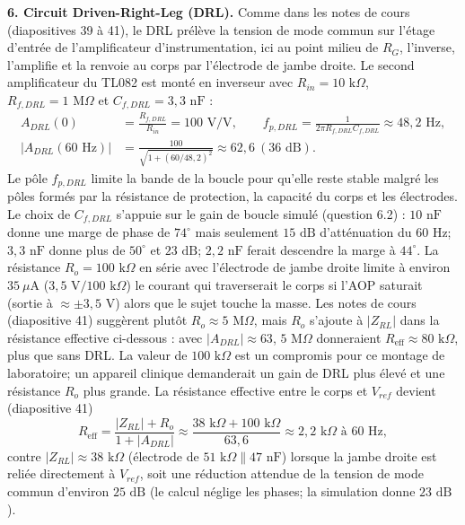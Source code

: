 \documentclass[11pt,letterpaper]{article}
\begin{document}
\textbf{6. Circuit Driven-Right-Leg (DRL).}
Comme dans les notes de cours (diapositives 39 à 41), le DRL prélève la tension de mode commun sur l'étage d'entrée de l'amplificateur d'instrumentation, ici au point milieu de $R_G$, l'inverse, l'amplifie et la renvoie au corps par l'électrode de jambe droite. Le second amplificateur du TL082 est monté en inverseur avec $R_{in} = 10\text{ k}\Omega$, $R_{f,DRL} = 1\text{ M}\Omega$ et $C_{f,DRL} = 3,3\text{ nF}$ :
\begin{align*}
A_{DRL}(0) &= \frac{R_{f,DRL}}{R_{in}} = 100\text{ V/V}, \qquad f_{p,DRL} = \frac{1}{2\pi R_{f,DRL} C_{f,DRL}} \approx 48,2\text{ Hz}, \\
|A_{DRL}(60\text{ Hz})| &= \frac{100}{\sqrt{1 + (60/48,2)^2}} \approx 62,6 \ (36\text{ dB}).
\end{align*}
Le pôle $f_{p,DRL}$ limite la bande de la boucle pour qu'elle reste stable malgré les pôles formés par la résistance de protection, la capacité du corps et les électrodes. Le choix de $C_{f,DRL}$ s'appuie sur le gain de boucle simulé (question 6.2) : $10\text{ nF}$ donne une marge de phase de $74^\circ$ mais seulement $15\text{ dB}$ d'atténuation du $60\text{ Hz}$; $3,3\text{ nF}$ donne plus de $50^\circ$ et $23\text{ dB}$; $2,2\text{ nF}$ ferait descendre la marge à $44^\circ$. La résistance $R_o = 100\text{ k}\Omega$ en série avec l'électrode de jambe droite limite à environ $35\ \mu\text{A}$ ($3,5\text{ V}/100\text{ k}\Omega$) le courant qui traverserait le corps si l'AOP saturait (sortie à $\approx \pm 3,5\text{ V}$) alors que le sujet touche la masse. Les notes de cours (diapositive 41) suggèrent plutôt $R_o \approx 5\text{ M}\Omega$, mais $R_o$ s'ajoute à $|Z_{RL}|$ dans la résistance effective ci-dessous : avec $|A_{DRL}| \approx 63$, $5\text{ M}\Omega$ donneraient $R_{\text{eff}} \approx 80\text{ k}\Omega$, plus que sans DRL. La valeur de $100\text{ k}\Omega$ est un compromis pour ce montage de laboratoire; un appareil clinique demanderait un gain de DRL plus élevé et une résistance $R_o$ plus grande. La résistance effective entre le corps et $V_{ref}$ devient (diapositive 41)
\[
R_{\text{eff}} = \frac{|Z_{RL}| + R_o}{1 + |A_{DRL}|} \approx \frac{38\text{ k}\Omega + 100\text{ k}\Omega}{63,6} \approx 2,2\text{ k}\Omega \text{ à } 60\text{ Hz},
\]
contre $|Z_{RL}| \approx 38\text{ k}\Omega$ (électrode de $51\text{ k}\Omega \parallel 47\text{ nF}$) lorsque la jambe droite est reliée directement à $V_{ref}$, soit une réduction attendue de la tension de mode commun d'environ $25\text{ dB}$ (le calcul néglige les phases; la simulation donne $23\text{ dB}$).
\end{document}
